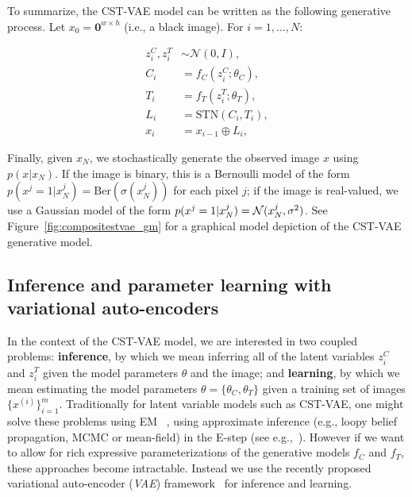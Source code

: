  

To summarize, the CST-VAE model can be written as the following generative process.  Let $x_0=\mathbf{0}^{w\times h}$ (i.e., a black image).   For $i=1,\dots,N$:\vspace{-4mm}

{\footnotesize
\begin{align*}
z_i^C, z_i^T  &\sim \mathcal{N}(0, I), \\
C_i &= f_C(z_i^C; \theta_C), \\
T_i &= f_T(z_i^T; \theta_T), \\
L_i &= \mbox{STN}(C_i, T_i), \\
x_i &= x_{i-1} \oplus L_i,
\end{align*}\vspace{-4mm}
} 

Finally, given $x_N$, we stochastically generate the observed image
$x$ using $p(x|x_N)$.
If the image is binary, this is a Bernoulli
model of the form $p(x^j=1|x_N^j) = \mbox{Ber}(\sigma(x_N^j))$
for each pixel $j$;
if the image is real-valued, we use a Gaussian model of the form
$p(x^j=1|x_N^j) = {\cal N}(x_N^j, \sigma^2)$.
See Figure~\ref{fig:compositestvae_gm} for
 a graphical model depiction of the CST-VAE generative model.




\subsection{Inference and parameter learning with variational auto-encoders}

In the context of the CST-VAE model, we are  interested in two coupled
problems: 
\textbf{inference}, by which we mean inferring all of the latent
variables $z^C_i$ and $z^T_i$ given the model parameters $\theta$
and the image;
and 
 \textbf{learning}, by which we mean estimating the model parameters
$\theta=\{\theta_C,\theta_T\}$ given a training set of images
$\{x^{(i)}\}_{i=1}^m$.
Traditionally for latent
variable models such as CST-VAE, one might solve these problems using
EM ~\citep{dempster1977maximum},
using approximate inference (e.g., loopy
belief propagation, MCMC or mean-field)
in the E-step (see e.g.,~\cite{wainwright2008graphical}).
 However if we want to allow for
rich expressive parameterizations of the generative models $f_C$ and
$f_T$, these 
approaches become intractable.  Instead we use the recently proposed
variational auto-encoder (\emph{VAE}) framework~\citep{Kingma2014} for
inference and learning.


